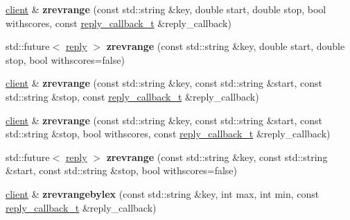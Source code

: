 \begin{DoxyCompactItemize}
\hyperlink{classcpp__redis_1_1client}{client} \& {\bfseries zrevrange} (const std\+::string \&key, double start, double stop, bool withscores, const \hyperlink{classcpp__redis_1_1client_a061a1140d36d2eaeda82b09a0bb3f9f2}{reply\+\_\+callback\+\_\+t} \&reply\+\_\+callback)
\item 
\mbox{\label{classcpp__redis_1_1client_a85aa18b29763edd1d93c4b463b6b3a51}} 
std\+::future$<$ \hyperlink{classcpp__redis_1_1reply}{reply} $>$ {\bfseries zrevrange} (const std\+::string \&key, double start, double stop, bool withscores=false)
\item 
\mbox{\label{classcpp__redis_1_1client_ab72a94b6f16cb23cf39275bfc9e35385}} 
\hyperlink{classcpp__redis_1_1client}{client} \& {\bfseries zrevrange} (const std\+::string \&key, const std\+::string \&start, const std\+::string \&stop, const \hyperlink{classcpp__redis_1_1client_a061a1140d36d2eaeda82b09a0bb3f9f2}{reply\+\_\+callback\+\_\+t} \&reply\+\_\+callback)
\item 
\mbox{\label{classcpp__redis_1_1client_ae4cef5e8cba4196287bf89375889a2e4}} 
\hyperlink{classcpp__redis_1_1client}{client} \& {\bfseries zrevrange} (const std\+::string \&key, const std\+::string \&start, const std\+::string \&stop, bool withscores, const \hyperlink{classcpp__redis_1_1client_a061a1140d36d2eaeda82b09a0bb3f9f2}{reply\+\_\+callback\+\_\+t} \&reply\+\_\+callback)
\item 
\mbox{\label{classcpp__redis_1_1client_a973fb4632a18f70bec092f3c9659045e}} 
std\+::future$<$ \hyperlink{classcpp__redis_1_1reply}{reply} $>$ {\bfseries zrevrange} (const std\+::string \&key, const std\+::string \&start, const std\+::string \&stop, bool withscores=false)
\item 
\mbox{\label{classcpp__redis_1_1client_aea70289a3a7652010371d572572f1129}} 
\hyperlink{classcpp__redis_1_1client}{client} \& {\bfseries zrevrangebylex} (const std\+::string \&key, int max, int min, const \hyperlink{classcpp__redis_1_1client_a061a1140d36d2eaeda82b09a0bb3f9f2}{reply\+\_\+callback\+\_\+t} \&reply\+\_\+callback)
\item 
\mbox{\label{classcpp__redis_1_1client_ac4bc45fdb5e11691c6c0539d769900b5}} 

\end{DoxyCompactItemize}
